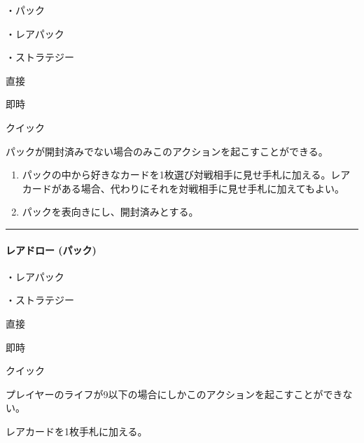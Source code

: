 \documentclass[letterpaper,10pt,dvipdfmx]{sphinxmanual}
\begin{document}
\sphinxAtStartPar
・パック

\sphinxAtStartPar
・レアパック

\sphinxAtStartPar
・ストラテジー

\sphinxAtStartPar
{} 直接

\sphinxAtStartPar
{} 即時

\sphinxAtStartPar
{} クイック

\sphinxAtStartPar
{}

\sphinxAtStartPar
パックが開封済みでない場合のみこのアクションを起こすことができる。

\sphinxAtStartPar
{}
\begin{enumerate}
%
\item {} 
\sphinxAtStartPar
パックの中から好きなカードを1枚選び対戦相手に見せ手札に加える。レアカードがある場合、代わりにそれを対戦相手に見せ手札に加えてもよい。

\item {} 
\sphinxAtStartPar
パックを表向きにし、開封済みとする。

\end{enumerate}


\bigskip\hrule\bigskip



\paragraph{レアドロー (パック)}
\label{\detokenize{auto/frameActionlist:act-raredraw}}\label{\detokenize{auto/frameActionlist:id5}}
\sphinxAtStartPar
{}

\sphinxAtStartPar
・レアパック

\sphinxAtStartPar
・ストラテジー

\sphinxAtStartPar
{} 直接

\sphinxAtStartPar
{} 即時

\sphinxAtStartPar
{} クイック

\sphinxAtStartPar
{}

\sphinxAtStartPar
プレイヤーのライフが9以下の場合にしかこのアクションを起こすことができない。

\sphinxAtStartPar
{}

\sphinxAtStartPar
レアカードを1枚手札に加える。
\end{document}
